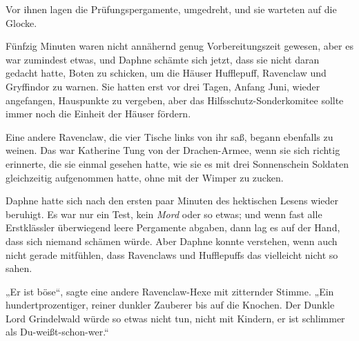 Vor ihnen lagen die Prüfungspergamente, umgedreht, und sie warteten auf die Glocke.

Fünfzig Minuten waren nicht annähernd genug Vorbereitungszeit gewesen, aber es war zumindest etwas, und Daphne schämte sich jetzt, dass sie nicht daran gedacht hatte, Boten zu schicken, um die Häuser Hufflepuff, Ravenclaw und Gryffindor zu warnen. Sie hatten erst vor drei Tagen, Anfang Juni, wieder angefangen, Hauspunkte zu vergeben, aber das Hilfsschutz-Sonderkomitee sollte immer noch die Einheit der Häuser fördern.

Eine andere Ravenclaw, die vier Tische links von ihr saß, begann ebenfalls zu weinen. Das war Katherine Tung von der Drachen-Armee, wenn sie sich richtig erinnerte, die sie einmal gesehen hatte, wie sie es mit drei Sonnenschein Soldaten gleichzeitig aufgenommen hatte, ohne mit der Wimper zu zucken.

Daphne hatte sich nach den ersten paar Minuten des hektischen Lesens wieder beruhigt. Es war nur ein Test, kein \emph{Mord} oder so etwas; und wenn fast alle Erstklässler überwiegend leere Pergamente abgaben, dann lag es auf der Hand, dass sich niemand schämen würde. Aber Daphne konnte verstehen, wenn auch nicht gerade mitfühlen, dass Ravenclaws und Hufflepuffs das vielleicht nicht so sahen.

„Er ist böse“, sagte eine andere Ravenclaw-Hexe mit zitternder Stimme. „Ein hundertprozentiger, reiner dunkler Zauberer bis auf die Knochen. Der Dunkle Lord Grindelwald würde so etwas nicht tun, nicht mit Kindern, er ist schlimmer als Du-weißt-schon-wer.“

